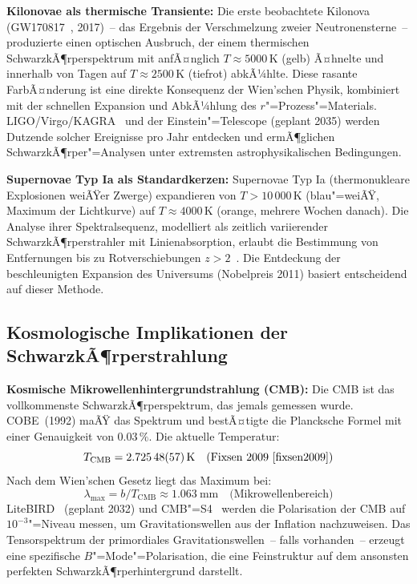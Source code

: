 ﻿\documentclass[a4paper,12pt]{article}
\theoremstyle{definition}
\begin{document}
\textbf{Kilonovae als thermische Transiente:}
Die erste beobachtete Kilonova (GW170817~\cite{abbott2017}, 2017)~-- das
Ergebnis der Verschmelzung zweier Neutronensterne~-- produzierte einen
optischen Ausbruch, der einem thermischen SchwarzkÃ¶rperspektrum mit
anfÃ¤nglich $T \approx 5000\,\text{K}$ (gelb) Ã¤hnelte und innerhalb von
Tagen auf $T \approx 2500\,\text{K}$ (tiefrot) abkÃ¼hlte. Diese rasante
FarbÃ¤nderung ist eine direkte Konsequenz der Wien'schen Physik, kombiniert
mit der schnellen Expansion und AbkÃ¼hlung des $r$"=Prozess"=Materials.
LIGO/Virgo/KAGRA~\cite{abbott2017} und der Einstein"=Telescope (geplant 2035)
werden Dutzende solcher Ereignisse pro Jahr entdecken und ermÃ¶glichen
SchwarzkÃ¶rper"=Analysen unter extremsten astrophysikalischen Bedingungen.

\textbf{Supernovae Typ Ia als Standardkerzen:}
Supernovae Typ Ia (thermonukleare Explosionen weiÃŸer Zwerge) expandieren
von $T > 10\,000\,\text{K}$ (blau"=weiÃŸ, Maximum der Lichtkurve)
auf $T \approx 4000\,\text{K}$ (orange, mehrere Wochen danach).
Die Analyse ihrer Spektralsequenz, modelliert als zeitlich variierender
SchwarzkÃ¶rperstrahler mit Linienabsorption, erlaubt die Bestimmung
von Entfernungen bis zu Rotverschiebungen $z > 2$~\cite{perlmutter1999}.
Die Entdeckung der beschleunigten Expansion des Universums (Nobelpreis 2011)
basiert entscheidend auf dieser Methode.

\subsection{Kosmologische Implikationen der SchwarzkÃ¶rperstrahlung}

\textbf{Kosmische Mikrowellenhintergrundstrahlung (CMB):}
Die CMB ist das vollkommenste SchwarzkÃ¶rperspektrum, das jemals gemessen
wurde. COBE~(1992) maÃŸ das Spektrum und bestÃ¤tigte die Plancksche Formel
mit einer Genauigkeit von $0.03\,\%$. Die aktuelle Temperatur:
\[
    T_{\text{CMB}} = \SI{2.72548 \pm 0.00057}{\kelvin}
    \quad \text{(Fixsen 2009~\cite{fixsen2009})}
\]
Nach dem Wien'schen Gesetz liegt das Maximum bei:
\[
    \lambda_{\max} = b / T_{\text{CMB}} \approx \SI{1.063}{\milli\metre}
    \quad \text{(Mikrowellenbereich)}
\]
LiteBIRD~\cite{litebird2023} (geplant 2032) und CMB"=S4~\cite{cmbs4}
werden die Polarisation der CMB auf $10^{-3}$"=Niveau messen, um
Gravitationswellen aus der Inflation nachzuweisen. Das Tensorspektrum
der primordiales Gravitationswellen~-- falls vorhanden~-- erzeugt
eine spezifische $B$"=Mode"=Polarisation, die eine Feinstruktur auf
dem ansonsten perfekten SchwarzkÃ¶rperhintergrund darstellt.
\end{document}
